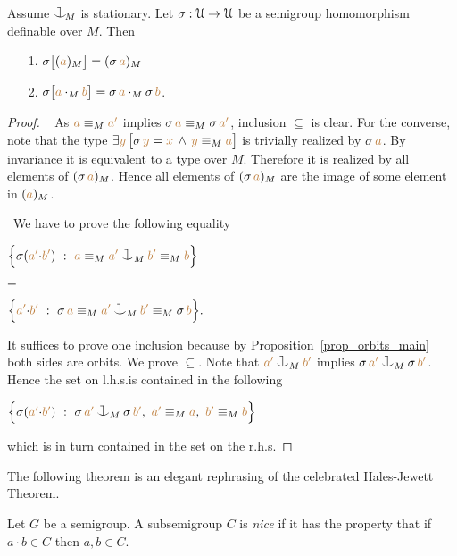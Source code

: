 \begin{proposition}\label{prop_HJ_tecnical}
  Assume $\cnonfork_{\!M}$ is stationary.
Let $\sigma:\EuScript U\to\EuScript U$ be a semigroup homomorphism definable over $M$.
Then 
\begin{itemize}
\item[1.] $\sigma\big[({\color{brown} a})_M\big]=(\sigma\,{\color{brown} a})_M$

\item[2.]
$\sigma\big[{\color{brown} a}\cdot_M{\color{brown} b}\big]=\sigma\,{\color{brown} a}\cdot_M\sigma\,{\color{brown} b}$.
\end{itemize}
\end{proposition}
\begin{proof}\   
As ${\color{brown} a}\equiv_M{\color{brown} a'}$ implies $\sigma\,{\color{brown} a}\equiv_M\sigma\,{\color{brown} a'}$,
inclusion $\subseteq$ is clear.
For the converse, note that the type 
$\exists{\color{brown}y}\,\big[\sigma\,{\color{brown} y}={\color{brown} x}\,\wedge\,{\color{brown} y}\equiv_M{\color{brown} a}\big]$ 
is trivially realized by $\sigma\,{\color{brown} a}$.
By invariance it is equivalent to a type over $M$.
Therefore it is realized by all elements of $(\sigma\,{\color{brown} a})_M$.
Hence all elements of $(\sigma\,{\color{brown} a})_M$ are the image of some element in $({\color{brown} a})_M$.

\def\medrel#1{\parbox[t]{6ex}{$\displaystyle\hfil #1$}}
\def\ceq#1#2#3{\parbox[t]{39ex}{$\displaystyle #1$}\medrel{#2}{$\displaystyle #3$}}
 \  
We have to prove the following equality\smallskip

\ceq{\hfill\Big\{\sigma({\mr a'}{\cdot}{\mr b'})\ :\ {\mr a}\equiv_M{\mr a'}\cnonfork_M{\mr b'}\equiv_M{\mr b} \Big\}}
{=}
{\Big\{{\mr a'}{\cdot}{\mr b'}\ :\ \sigma\,{\mr a}\equiv_M{\mr a'}\cnonfork_M{\mr b'}\equiv_M\sigma\,{\mr b} \Big\}.}\smallskip

It suffices to prove one inclusion because by Proposition~\ref{prop_orbits_main} both sides are orbits.
We prove $\subseteq$.
Note that ${\mr a'}\cnonfork_M{\mr b'}$ implies $\sigma\,{\mr a'}\cnonfork_M\sigma\,{\mr b'}$.
Hence the set on l.h.s.\@ is contained in the following\smallskip

\hfil$\Big\{\sigma({\mr a'}{\cdot}{\mr b'})\ :\ \sigma\,{\mr a'}\cnonfork_M\sigma\,{\mr b'},\ {\mr a'}\equiv_M{\mr a},\  {\mr b'}\equiv_M{\mr b} \Big\}$\smallskip

which is in turn contained in the set on the r.h.s.
\end{proof}
 
The following theorem is an elegant rephrasing of the celebrated Hales-Jewett Theorem.

Let $G$ be a semigroup.
A subsemigroup $C$ is \emph{nice\/} if it has the property that if $a{\cdot}b\in C$ then $a,b\in C$.

